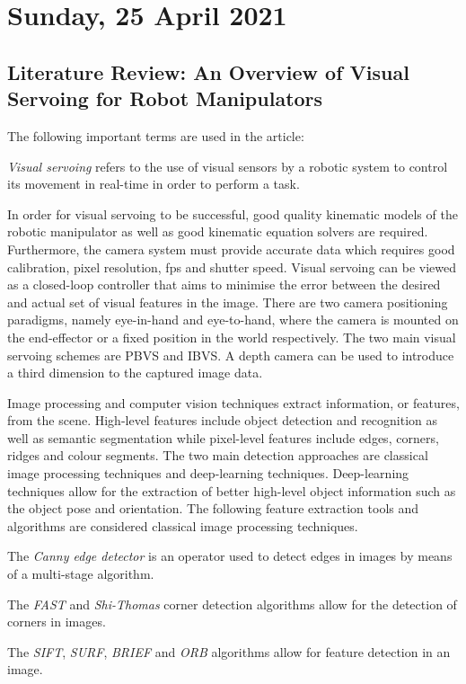 \pendsign

\section[2021/04/25]{Sunday, 25 April 2021}

\subsection{Literature Review: An Overview of Visual Servoing for Robot Manipulators \cite{Kumar2020}}

The following important terms are used in the article:

\begin{compactitem}
    \item \textit{Visual servoing} refers to the use of visual sensors by a robotic system to control its movement in real-time in order to perform a task.
\end{compactitem}

In order for visual servoing to be successful, good quality kinematic models of the robotic manipulator as well as good kinematic equation solvers are required. Furthermore, the camera system must provide accurate data which requires good calibration, pixel resolution, \ac{fps} and shutter speed. Visual servoing can be viewed as a closed-loop controller that aims to minimise the error between the desired and actual set of visual features in the image. There are two camera positioning paradigms, namely eye-in-hand and eye-to-hand, where the camera is mounted on the end-effector or a fixed position in the world respectively. The two main visual servoing schemes are \ac{PBVS} and \ac{IBVS}. A depth camera can be used to introduce a third dimension to the captured image data.

Image processing and computer vision techniques extract information, or features, from the scene. High-level features include object detection and recognition as well as semantic segmentation while pixel-level features include edges, corners, ridges and colour segments. The two main detection approaches are classical image processing techniques and deep-learning techniques. Deep-learning techniques allow for the extraction of better high-level object information such as the object pose and orientation. The following feature extraction tools and algorithms are considered classical image processing techniques.

\begin{compactitem}
    \item The \textit{Canny edge detector} is an operator used to detect edges in images by means of a multi-stage algorithm.
    \item The \textit{\ac{FAST}} and \textit{Shi-Thomas} corner detection algorithms allow for the detection of corners in images.
    \item The \textit{\ac{SIFT}}, \textit{\ac{SURF}}, \textit{\ac{BRIEF}} and \textit{\ac{ORB}} algorithms allow for feature detection in an image.
\end{compactitem}

